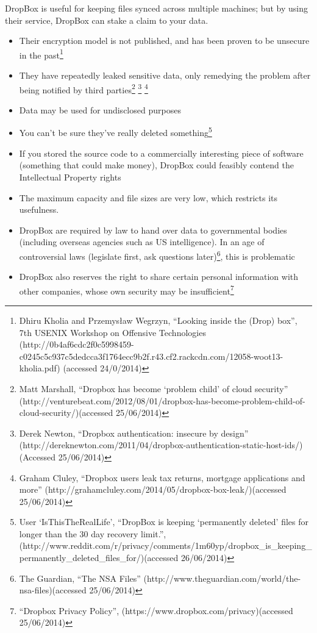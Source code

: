 \documentclass[12pt,a4paper,]{adreport}
\begin{document}
DropBox is useful for keeping files synced across multiple machines; but
by using their service, DropBox can stake a claim to your data.

\begin{itemize}
\itemsep1pt\parskip0pt
\item
  Their encryption model is not published, and has been proven to be
  unsecure in the past\footnote{Dhiru Kholia and Przemysław Wegrzyn,
    ``Looking inside the (Drop) box'', 7th USENIX Workshop on Offensive
    Technologies
    (http://0b4af6cdc2f0c5998459-c0245c5c937c5dedcca3f1764ecc9b2f.r43.cf2.rackcdn.com/12058-woot13-kholia.pdf)
    (accessed 24/0/2014)}
\item
  They have repeatedly leaked sensitive data, only remedying the problem
  after being notified by third parties\footnote{Matt Marshall,
    ``Dropbox has become `problem child' of cloud security''
    (http://venturebeat.com/2012/08/01/dropbox-has-become-problem-child-of-cloud-security/)(accessed
    25/06/2014)} \footnote{Derek Newton, ``Dropbox authentication:
    insecure by design''
    (http://dereknewton.com/2011/04/dropbox-authentication-static-host-ids/)(Accessed
    25/06/2014)} \footnote{Graham Cluley, ``Dropbox users leak tax
    returns, mortgage applications and more''
    (http://grahamcluley.com/2014/05/dropbox-box-leak/)(accessed
    25/06/2014)}
\item
  Data may be used for undisclosed purposes
\item
  You can't be sure they've really deleted something\footnote{User
    `IsThisTheRealLife', ``DropBox is keeping `permanently deleted'
    files for longer than the 30 day recovery limit.'',
    (http://www.reddit.com/r/privacy/comments/1m60yp/dropbox\_is\_keeping\_permanently\_deleted\_files\_for/)(accessed
    26/06/2014)}
\item
  If you stored the source code to a commercially interesting piece of
  software (something that could make money), DropBox could feasibly
  contend the Intellectual Property rights
\item
  The maximum capacity and file sizes are very low, which restricts its
  usefulness.
\item
  DropBox are required by law to hand over data to governmental bodies
  (including overseas agencies such as US intelligence). In an age of
  controversial laws (legislate first, ask questions later)\footnote{The
    Guardian, ``The NSA Files''
    (http://www.theguardian.com/world/the-nsa-files)(accessed
    25/06/2014)}, this is problematic
\item
  DropBox also reserves the right to share certain personal information
  with other companies, whose own security may be insufficient\footnote{``Dropbox
    Privacy Policy'', (https://www.dropbox.com/privacy)(accessed
    25/06/2014)}
\end{itemize}
\end{document}
